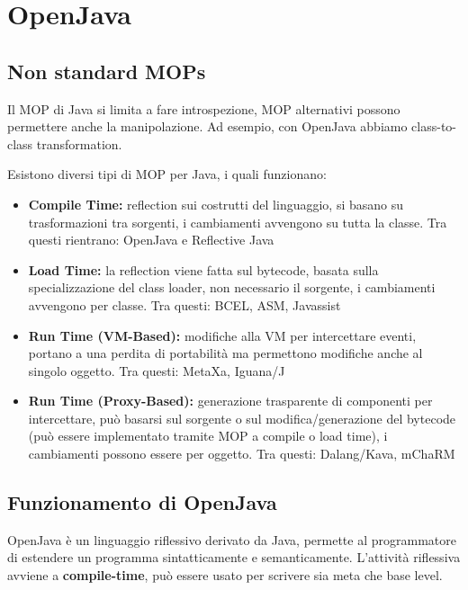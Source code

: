 \section{OpenJava}

\subsection{Non standard MOPs}

Il MOP di Java si limita a fare introspezione, MOP alternativi possono permettere anche la manipolazione. Ad esempio, con OpenJava abbiamo class-to-class transformation.

Esistono diversi tipi di MOP per Java, i quali funzionano:
\begin{itemize}
    \item \textbf{Compile Time:} reflection sui costrutti del linguaggio, si basano su trasformazioni tra sorgenti, i cambiamenti avvengono su tutta la classe. Tra questi rientrano: OpenJava e Reflective Java

    \item \textbf{Load Time:} la reflection viene fatta sul bytecode, basata sulla specializzazione del class loader, non necessario il sorgente, i cambiamenti avvengono per classe. Tra questi: BCEL, ASM, Javassist

    \item \textbf{Run Time (VM-Based):} modifiche alla VM per intercettare eventi, portano a una perdita di portabilità ma permettono modifiche anche al singolo oggetto. Tra questi: MetaXa, Iguana/J

    \item \textbf{Run Time (Proxy-Based):} generazione trasparente di componenti per intercettare, può basarsi sul sorgente o sul modifica/generazione del bytecode (può essere implementato tramite  MOP a compile o load time), i cambiamenti possono essere per oggetto. Tra questi: Dalang/Kava, mChaRM
\end{itemize}


\subsection{Funzionamento di OpenJava}
OpenJava è un linguaggio riflessivo derivato da Java, permette al programmatore di estendere un programma sintatticamente e semanticamente. L'attività riflessiva avviene a \textbf{compile-time}, può essere usato per scrivere sia meta che base level.

